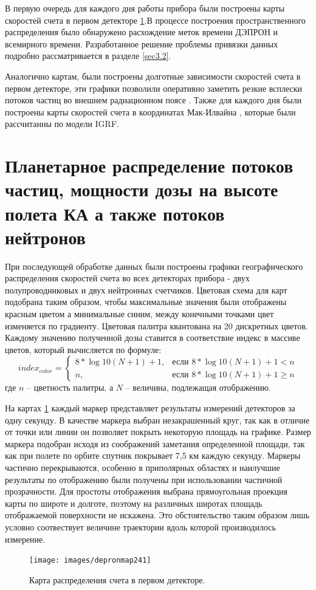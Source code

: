 В первую очередь для каждого дня работы прибора были построены карты скоростей счета в первом детекторе \ref{sec:planetDose}.В процессе построения пространственного распределения было обнаружено расхождение меток времени  ДЭПРОН и всемирного времени. Разработанное решение проблемы привязки данных подробно рассматривается в разделе \ref{sec3.2}.

Аналогично картам, были построены долготные зависимости скоростей счета в первом детекторе, эти графики позволили оперативно заметить резкие всплески потоков частиц во внешнем радиационном поясе \label{sec:flash_analisys}. Также для каждого дня были построены карты скоростей счета в координатах Мак-Илвайна \cite{McIlwain1961}, которые были рассчитанны по модели IGRF.

\section{Планетарное распределение потоков частиц, мощности дозы на высоте полета КА а также потоков нейтронов} \label{sec:planetDose}
При последующей обработке данных были построены графики географического распределения скоростей счета во всех детекторах прибора - двух полупроводниковых и двух нейтронных счетчиков. Цветовая схема для карт подобрана таким образом, чтобы максимальные значения были отображены красным цветом а минимальные синим, между конечными точками цвет изменяется по градиенту. Цветовая палитра квантована на 20 дискретных цветов. Каждому значению полученной дозы ставится в соответствие индекс в массиве цветов, который вычисляется по формуле:
\begin{equation*}
index_{color} = \begin{cases}
	8*\log{10}(N + 1)+1,  & \text{если } 8*\log{10}(N + 1) +1 < n \\
	n,  & \text{если } 8*\log{10}(N + 1) +1 \ge n
	\end{cases}
\end{equation*}
		где $ n $ -- цветность палитры, а $ N $ -- величина, подлежащая отображению.
						
%
На картах 	\ref{fig:depronmap241} каждый маркер представляет результаты измерений детекторов за одну секунду. В качестве маркера выбран незакрашенный круг, так как в отличие от точки или линии он позволяет покрыть некоторую площадь на графике. Размер маркера подобран исходя из соображений заметания определенной площади, так как  при полете по орбите спутник покрывает 7,5 км каждую секунду. Маркеры частично перекрываются, особенно в приполярных областях и наилучшие результаты по отображению были получены при использовании частичной прозрачности. Для простоты отображения выбрана прямоугольная проекция карты по широте и долготе, поэтому на различных широтах площадь отображаемой поверхности не искажена. Это обстоятельство таким образом лишь условно соотвествует величине траектории вдоль которой производилось измерение.
\begin{figure}[h]
	\centering
	\texttt{[image: images/depronmap241]}
	\caption{Карта распределения счета в первом детекторе.}
	\label{fig:depronmap241}
\end{figure}

